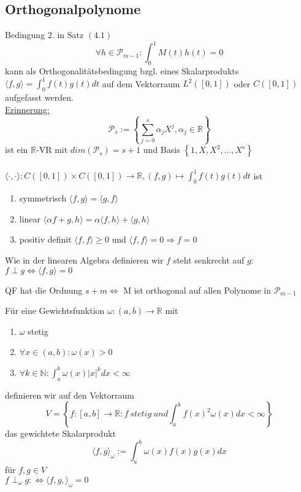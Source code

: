 \subsection{Orthogonalpolynome}
Bedingung $2.$ in Satz $(4.1)$ 
$$ \forall h \in \mathcal{P}_{m-1}: \int_0^1 M(t)h(t) = 0$$
kann als Orthogonalitätsbedingung bzgl. eines Skalarprodukts $\langle f, g\rangle = \int_0^1 f(t)g(t)dt$ auf dem Vektorraum $L^2([0,1])$ oder $C([0,1])$ aufgefasst werden. \\
\underline{Erinnerung:}
$$\mathcal{P}_s := \left\{ \sum_{j=0}^s \alpha_j X^j, \alpha_j \in \mathbb{R} \right\}$$ 
ist ein $\mathbb{R}$-VR mit $dim(\mathcal{P}_s) = s+1$ und Basis $\left\{ 1, X, X^2, ..., X^s \right\}$\\ \\
$\langle\cdot,\cdot\rangle : C([0,1]) \times C([0,1]) \rightarrow \mathbb{R}, (f, g) \mapsto \int_0^1 f(t)g(t)dt$ ist 
\begin{enumerate}
  \item symmetrisch $ \langle f, g\rangle = \langle g, f\rangle$
  \item linear $\langle \alpha f + g, h\rangle = \alpha \langle f, h\rangle + \langle g, h\rangle$
  \item positiv definit $\langle f, f\rangle \geq 0 $ und $ \langle f, f\rangle = 0 \Rightarrow f = 0$
\end{enumerate}
Wie in der linearen Algebra definieren wir $f$ steht senkrecht auf $g$: $f \perp g \Leftrightarrow \langle f, g\rangle = 0$

\begin{theorem}
QF hat die Ordnung $s+m \Leftrightarrow $ M ist orthogonal auf allen Polynome in $\mathcal{P}_{m-1}$
\end{theorem}

\begin{definition}
Für eine Gewichtsfunktion $\omega : (a, b) \rightarrow \mathbb{R}$ mit 
\begin{enumerate}
  \item $\omega$ stetig
  \item $\forall x\in(a,b): \omega(x) > 0 $
  \item $\forall k \in \mathbb{N}: \int_a^b \omega(x) \vert x \vert^k dx < \infty$
\end{enumerate}
definieren wir auf den Vektorraum 
$$ V = \left\{ f: [a,b] \rightarrow \mathbb{R}: f \medspace stetig \medspace und \int_a^b f(x)^2 \omega(x) dx < \infty \right\} $$
das gewichtete Skalarprodukt
$$ \langle f, g \rangle_\omega := \int_a^b \omega(x)f(x)g(x)dx$$
für $f, g \in V$ \\
$f \perp_\omega g :\Leftrightarrow \langle f, g, \rangle_\omega = 0$
\end{definition}

